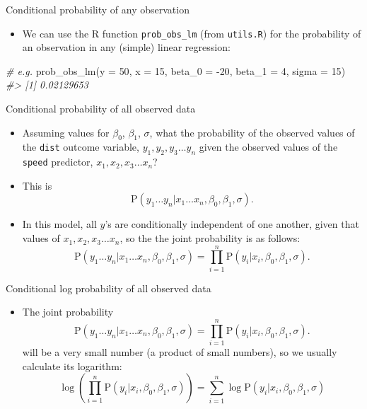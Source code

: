 \documentclass[
  10pt,
  ignorenonframetext,
]{beamer}
\newenvironment{Shaded}{\begin{snugshade}}{\end{snugshade}}
\newcommand{\AttributeTok}[1]{\textcolor[rgb]{0.77,0.63,0.00}{#1}}
\newcommand{\CommentTok}[1]{\textcolor[rgb]{0.56,0.35,0.01}{\textit{#1}}}
\newcommand{\DecValTok}[1]{\textcolor[rgb]{0.00,0.00,0.81}{#1}}
\newcommand{\FunctionTok}[1]{\textcolor[rgb]{0.00,0.00,0.00}{#1}}
\newcommand{\NormalTok}[1]{#1}
\newcommand{\SpecialCharTok}[1]{\textcolor[rgb]{0.00,0.00,0.00}{#1}}
\providecommand{\tightlist}{%
  \setlength{\itemsep}{0pt}\setlength{\parskip}{0pt}}
\newcommand{\Prob}[1]{\mathrm{P}( #1 )}
\newcommand*{\given}{\vert}
\begin{document}
\begin{frame}[fragile]{Conditional probability of any observation}
\protect\hypertarget{conditional-probability-of-any-observation-3}{}
\begin{itemize}
\tightlist
\item
  We can use the R function \texttt{prob\_obs\_lm} (from
  \texttt{utils.R}) for the probability of an observation in any
  (simple) linear regression:
\end{itemize}

\begin{Shaded}
\begin{Highlighting}[]
\CommentTok{\# e.g.}
\FunctionTok{prob\_obs\_lm}\NormalTok{(}\AttributeTok{y =} \DecValTok{50}\NormalTok{, }
            \AttributeTok{x =} \DecValTok{15}\NormalTok{, }
            \AttributeTok{beta\_0 =} \SpecialCharTok{{-}}\DecValTok{20}\NormalTok{, }\AttributeTok{beta\_1 =} \DecValTok{4}\NormalTok{, }\AttributeTok{sigma =} \DecValTok{15}\NormalTok{)}
\CommentTok{\#\textgreater{} [1] 0.02129653}
\end{Highlighting}
\end{Shaded}
\end{frame}

\begin{frame}[fragile]{Conditional probability of all observed data}
\protect\hypertarget{conditional-probability-of-all-observed-data}{}
\begin{itemize}
\item
  Assuming values for \(\beta_0\), \(\beta_1\), \(\sigma\), what the
  probability of the observed values of the \texttt{dist} outcome
  variable, \(y_1, y_2, y_3 \ldots y_n\) given the observed values of
  the \texttt{speed} predictor, \(x_1, x_2, x_3 \ldots x_n\)?
\item
  This is \[
  \Prob{y_1 \ldots y_n \given x_1\ldots x_n, \beta_0, \beta_1, \sigma}.
  \]
\item
  In this model, all \(y\)'s are conditionally independent of one
  another, given that values of \(x_1, x_2, x_3 \ldots x_n\), so the the
  joint probability is as follows: \[
  \Prob{y_1 \ldots y_n \given x_1\ldots x_n, \beta_0, \beta_1, \sigma} = \prod_{i=1}^n \Prob{y_i \given x_i, \beta_0, \beta_1, \sigma}.
  \]
\end{itemize}
\end{frame}

\begin{frame}{Conditional log probability of all observed data}
\protect\hypertarget{conditional-log-probability-of-all-observed-data}{}
\begin{itemize}
\tightlist
\item
  The joint probability \[
  \Prob{y_1 \ldots y_n \given x_1\ldots x_n, \beta_0, \beta_1, \sigma} = \prod_{i=1}^n \Prob{y_i \given x_i, \beta_0, \beta_1, \sigma}.
  \] will be a very small number (a product of small numbers), so we
  usually calculate its logarithm: \[
  \log \left(\prod_{i=1}^n \Prob{y_i \given x_i, \beta_0, \beta_1, \sigma} \right) =
  \sum_{i=1}^n \log   \Prob{y_i \given x_i, \beta_0, \beta_1, \sigma} 
  \]
\end{itemize}
\end{frame}
\end{document}
